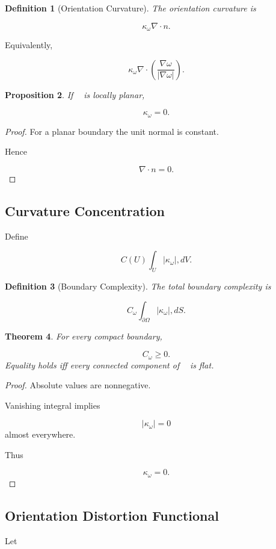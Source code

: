 \documentclass[12pt]{article}
\newtheorem{theorem}{Theorem}[section]
\newtheorem{proposition}[theorem]{Proposition}
\newtheorem{definition}[theorem]{Definition}
\theoremstyle{remark}
\begin{document}
\begin{definition}[Orientation Curvature]
The orientation curvature is

\[
\kappa_\omega
\nabla\cdot n.
\]
\end{definition}

Equivalently,

\[
\kappa_\omega
\nabla\cdot
\left(
\frac{\nabla\omega}
{|\nabla\omega|}
\right).
\]

\begin{proposition}
If \partial\Omega is locally planar,

\[
\kappa_\omega=0.
\]
\end{proposition}
\begin{proof}
For a planar boundary the unit normal is constant.

Hence

\[
\nabla\cdot n=0.
\]
\end{proof}
\subsection{Curvature Concentration}

Define

\[
C(U)
\int_U
|\kappa_\omega|
,dV.
\]

\begin{definition}[Boundary Complexity]
The total boundary complexity is

\[
C_\omega
\int_{\partial\Omega}
|\kappa_\omega|
,dS.
\]
\end{definition}

\begin{theorem}
For every compact boundary,

\[
C_\omega
\geq 0.
\]
Equality holds iff every connected component of
\partial\Omega is flat.
\end{theorem}

\begin{proof}
Absolute values are nonnegative.

Vanishing integral implies

\[
|\kappa_\omega|=0
\]
almost everywhere.

Thus

\[
\kappa_\omega=0.
\]
\end{proof}
\subsection{Orientation Distortion Functional}

Let
\end{document}

